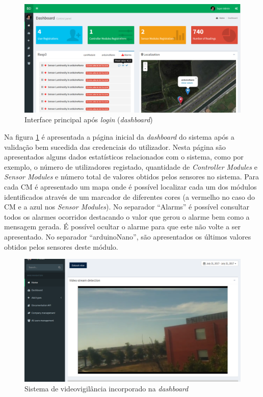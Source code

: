\newpage

\begin{figure}[h]
	\centering
	\includegraphics[width=0.94\linewidth]{prints-web/dashboard1.png}
	\caption{Interface principal após \textit{login} (\textit{dashboard})}
	\label{ddashboard}
\end{figure}




Na figura \ref{ddashboard} é apresentada a página inicial da \textit{dashboard} do sistema após a validação bem sucedida das credenciais do utilizador. Nesta página são apresentados alguns dados estatísticos relacionados com o sistema, como por exemplo, o número de utilizadores registado, quantidade de \textit{Controller Modules} e \textit{Sensor Modules} e número total de valores obtidos pelos sensores no sistema. Para cada \acl{CM} é apresentado um mapa onde é possível localizar cada um dos módulos identificados através de um marcador de diferentes cores (a vermelho no caso do \acl{CM} e a azul nos \textit{Sensor Modules}). No separador ``Alarms''  é possível consultar todos os alarmes ocorridos destacando o valor que gerou o alarme bem como a mensagem gerada. É possível ocultar o alarme para que este não volte a ser apresentado. No separador ``arduinoNano'', são apresentados os últimos valores obtidos pelos sensores deste módulo. 


\begin{figure}[h]
	\centering
	\includegraphics[width=0.7\linewidth]{prints-web/stream.png}
	\caption{Sistema de videovigilância incorporado na \textit{dashboard}}
	\label{vigilancia}
\end{figure}


